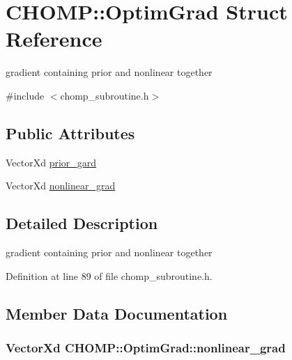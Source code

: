 \hypertarget{struct_c_h_o_m_p_1_1_optim_grad}{}\section{C\+H\+O\+MP\+:\+:Optim\+Grad Struct Reference}
\label{struct_c_h_o_m_p_1_1_optim_grad}


gradient containing prior and nonlinear together  




{\ttfamily \#include $<$chomp\+\_\+subroutine.\+h$>$}

\subsection*{Public Attributes}
\begin{DoxyCompactItemize}
\item 
Vector\+Xd \hyperlink{struct_c_h_o_m_p_1_1_optim_grad_a0fc686f410e24fe733a474d2cf139714}{prior\+\_\+gard}
\item 
Vector\+Xd \hyperlink{struct_c_h_o_m_p_1_1_optim_grad_ac961440e39d3355a2c9d82f0bb1c2dd2}{nonlinear\+\_\+grad}
\end{DoxyCompactItemize}


\subsection{Detailed Description}
gradient containing prior and nonlinear together 

Definition at line 89 of file chomp\+\_\+subroutine.\+h.



\subsection{Member Data Documentation}
\subsubsection[{\texorpdfstring{nonlinear\+\_\+grad}{nonlinear_grad}}]{\setlength{\rightskip}{0pt plus 5cm}Vector\+Xd C\+H\+O\+M\+P\+::\+Optim\+Grad\+::nonlinear\+\_\+grad}\hypertarget{struct_c_h_o_m_p_1_1_optim_grad_ac961440e39d3355a2c9d82f0bb1c2dd2}{}\label{struct_c_h_o_m_p_1_1_optim_grad_ac961440e39d3355a2c9d82f0bb1c2dd2}


